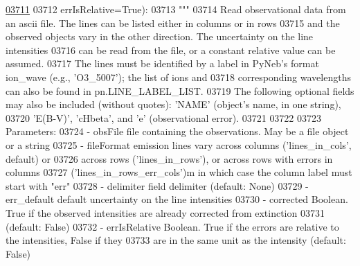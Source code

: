 \begin{DoxyCode}
\hypertarget{classpyneb_1_1core_1_1pynebcore_1_1_observation_l03711}{}\hyperlink{classpyneb_1_1core_1_1pynebcore_1_1_observation_aa33f35ce2f56f5b8a5666601b24a1107}{03711} 
03712                  errIsRelative=\textcolor{keyword}{True}):
03713         \textcolor{stringliteral}{"""}
03714 \textcolor{stringliteral}{        Read observational data from an ascii file. The lines can be listed either in columns or in rows}
03715 \textcolor{stringliteral}{        and the observed objects vary in the other direction. The uncertainty on the line intensities}
03716 \textcolor{stringliteral}{        can be read from the file, or a constant relative value can be assumed.}
03717 \textcolor{stringliteral}{        The lines must be identified by a label in PyNeb's format ion\_wave (e.g., 'O3\_5007'); the list of
       ions and}
03718 \textcolor{stringliteral}{        corresponding wavelengths can also be found in pn.LINE\_LABEL\_LIST.}
03719 \textcolor{stringliteral}{        The following optional fields may also be included (without quotes): 'NAME' (object's name, in one
       string), }
03720 \textcolor{stringliteral}{        'E(B-V)', 'cHbeta', and 'e' (observational error).}
03721 \textcolor{stringliteral}{        }
03722 \textcolor{stringliteral}{ }
03723 \textcolor{stringliteral}{        Parameters:}
03724 \textcolor{stringliteral}{            - obsFile        file containing the observations. May be a file object or a string }
03725 \textcolor{stringliteral}{            - fileFormat     emission lines vary across columns ('lines\_in\_cols', default) or }
03726 \textcolor{stringliteral}{                                across rows ('lines\_in\_rows'), or across rows with errors in columns }
03727 \textcolor{stringliteral}{                                ('lines\_in\_rows\_err\_cols')m in which case the column label must start with 
      "err"}
03728 \textcolor{stringliteral}{            - delimiter      field delimiter (default: None)  }
03729 \textcolor{stringliteral}{            - err\_default    default uncertainty on the line intensities}
03730 \textcolor{stringliteral}{            - corrected      Boolean. True if the observed intensities are already corrected from
       extinction}
03731 \textcolor{stringliteral}{                                 (default: False)}
03732 \textcolor{stringliteral}{            - errIsRelative  Boolean. True if the errors are relative to the intensities, False if they}
03733 \textcolor{stringliteral}{                                 are in the same unit as the intensity (default: False)}

\end{DoxyCode}
